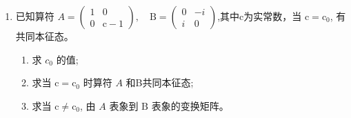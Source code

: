 
\begin{enumerate}
	\item
	已知算符 $A=\left(\begin{array}{cc}1 & 0 \\ 0 & \mathrm{c}-1\end{array}\right), \quad \mathrm{B}=\left(\begin{array}{cc}0 & -i \\ i & 0\end{array}\right)$,其中c为实常数，当 $\mathrm{c}=\mathrm{c}_{0}$, 有共同本征态。
	\begin{enumerate}
		\item
		求 $c_{0}$ 的值;
		\item 
		求当 $\mathrm{c}=\mathrm{c}_{0}$ 时算符 $A$ 和B共同本征态;
		\item 
		求当 $\mathrm{c} \neq \mathrm{c}_{0}$, 由 $A$ 表象到 $\mathrm{B}$ 表象的变换矩阵。
		
		
		
	\end{enumerate}



\end{enumerate}
